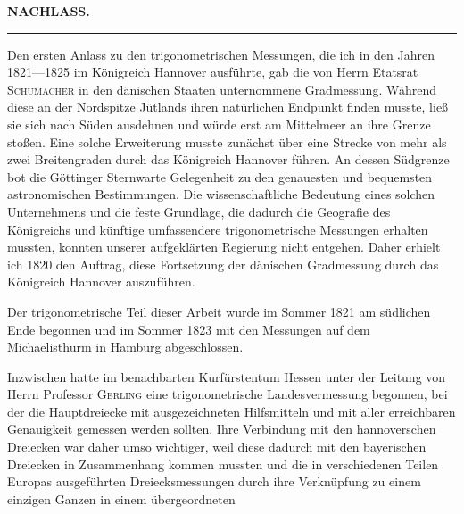 \clearpage
\noindent{}\hfill{\small\textbf{NACHLASS.}}\hfill\null\par
\vspace{2.5\baselineskip}
\begin{center}
{\large{}}\par\medskip
\rule{.12\linewidth}{.4pt}\par\medskip
{\large{}}
\end{center}

\par\noindent\hspace*{\parindent}Den ersten Anlass zu den trigonometrischen Messungen, die ich in den Jahren
1821---1825 im Königreich Hannover ausführte, gab die von Herrn Etatsrat
\textsc{Schumacher} in den dänischen Staaten unternommene Gradmessung. Während
diese an der Nordspitze Jütlands ihren natürlichen Endpunkt finden musste, ließ
sie sich nach Süden ausdehnen und würde erst am Mittelmeer an ihre Grenze stoßen. Eine solche Erweiterung musste
zunächst über eine Strecke von mehr als zwei Breitengraden durch das Königreich
Hannover führen. An dessen Südgrenze bot die Göttinger Sternwarte Gelegenheit
zu den genauesten und bequemsten astronomischen Bestimmungen. Die
wissenschaftliche Bedeutung eines solchen Unternehmens und die feste Grundlage,
die dadurch die Geografie des Königreichs und künftige umfassendere
trigonometrische Messungen erhalten mussten, konnten unserer aufgeklärten
Regierung nicht entgehen. Daher erhielt ich 1820 den Auftrag, diese Fortsetzung
der dänischen Gradmessung durch das Königreich Hannover auszuführen.

\par\noindent\hspace*{\parindent}Der trigonometrische Teil dieser Arbeit wurde im Sommer 1821 am
südlichen Ende begonnen und im Sommer 1823 mit den Messungen auf dem
Michaelisthurm in Hamburg abgeschlossen.

\par\noindent\hspace*{\parindent}Inzwischen hatte im benachbarten Kurfürstentum Hessen unter der Leitung
von Herrn Professor \textsc{Gerling} eine trigonometrische Landesvermessung begonnen,
bei der die Hauptdreiecke mit ausgezeichneten Hilfsmitteln und mit aller
erreichbaren Genauigkeit gemessen werden sollten. Ihre Verbindung mit den
hannoverschen Dreiecken war daher umso wichtiger, weil diese dadurch mit den
bayerischen Dreiecken in Zusammenhang kommen mussten und die in verschiedenen
Teilen Europas ausgeführten Dreiecksmessungen durch ihre Verknüpfung zu einem
einzigen Ganzen in einem übergeordneten
\par\clearpage

